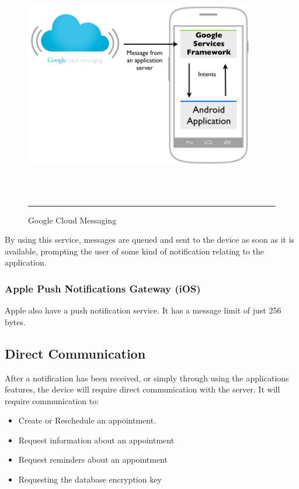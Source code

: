 \begin{figure}[htbp]
	\centering
\includegraphics[width=10cm,height=10cm,keepaspectratio]{Figures/PushNote.png}
		\rule{35em}{0.5pt}
	\caption[Google Cloud Messaging]{Google Cloud Messaging}
	\label{fig:PushNote}
\end{figure}

By using this service, messages are queued and sent to the device as soon as it is available, prompting the user of some kind of notification relating to the application.

\subsubsection{Apple Push Notifications Gateway (iOS)}

Apple also have a push notification service. It has a message limit of just 256 bytes.

\subsection{Direct Communication}

After a notification has been received, or simply through using the applications features, the device will require direct communication with the server. It will require communication to:

\begin{itemize}
	\item Create or Reschedule an appointment.
	\item Request information about an appointment
	\item Request reminders about an appointment
	\item Requesting the database encryption key
\end{itemize}

